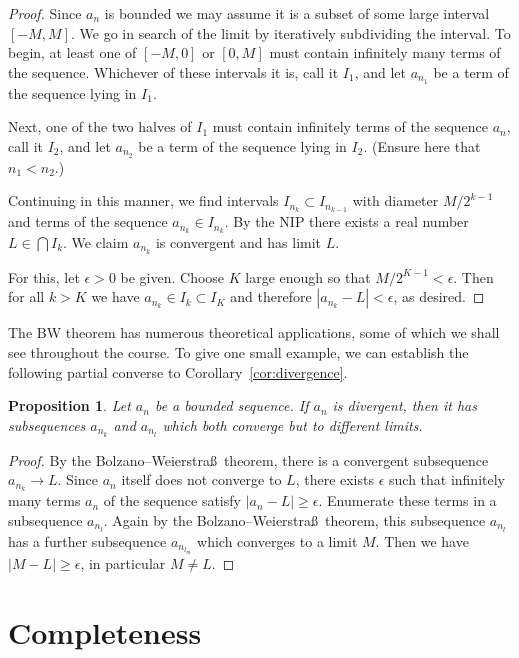 \documentclass[11pt,oneside]{amsbook}
\theoremstyle{definition}
\theoremstyle{plain}
\newtheorem{prop}[thm]{Proposition}
\theoremstyle{definition}
\theoremstyle{remark}
\numberwithin{equation}{section}
\numberwithin{figure}{section}
\begin{document}
\begin{proof}
  Since $a_n$ is bounded we may assume it is a subset of some large interval $[-M,M]$. We go in search of the limit by iteratively subdividing the interval. To begin, at least one of $[-M,0]$ or $[0,M]$ must contain infinitely many terms of the sequence. Whichever of these intervals it is, call it $I_1$, and let $a_{n_1}$ be a term of the sequence lying in $I_1$.

  Next, one of the two halves of $I_1$ must contain infinitely terms of the sequence $a_n$, call it $I_2$, and let $a_{n_2}$ be a term of the sequence lying in $I_2$. (Ensure here that $n_1<n_2$.)

  Continuing in this manner, we find intervals $I_{n_k}\subset I_{n_{k-1}}$ with diameter $M/2^{k-1}$ and terms of the sequence $a_{n_k}\in I_{n_k}$. By the NIP there exists a real number $L\in\bigcap I_k$. We claim $a_{n_k}$ is convergent and has limit $L$.

  For this, let $\epsilon>0$ be given. Choose $K$ large enough so that $M/2^{K-1}<\epsilon$. Then for all $k>K$ we have $a_{n_k}\in I_k\subset I_K$ and therefore $|a_{n_k}-L|<\epsilon$, as desired.
\end{proof}

The BW theorem has numerous theoretical applications, some of which we shall see throughout the course. To give one small example, we can establish the following partial converse to Corollary~\ref{cor:divergence}.

\begin{prop}
  Let $a_n$ be a bounded sequence. If $a_n$ is divergent, then it has subsequences $a_{n_k}$ and $a_{n_l}$ which both converge but to different limits.
\end{prop}

\begin{proof}
  By the Bolzano--Weierstra\ss\ theorem, there is a convergent subsequence $a_{n_k}\to L$. Since $a_n$ itself does not converge to $L$, there exists $\epsilon$ such that infinitely many terms $a_n$ of the sequence satisfy $|a_n-L|\geq\epsilon$. Enumerate these terms in a subsequence $a_{n_l}$. Again by the Bolzano--Weierstra\ss\ theorem, this subsequence $a_{n_l}$ has a further subsequence $a_{n_{l_m}}$ which converges to a limit $M$. Then we have $|M-L|\geq\epsilon$, in particular $M\neq L$.
\end{proof}

\newpage
\section{Completeness}
\end{document}
